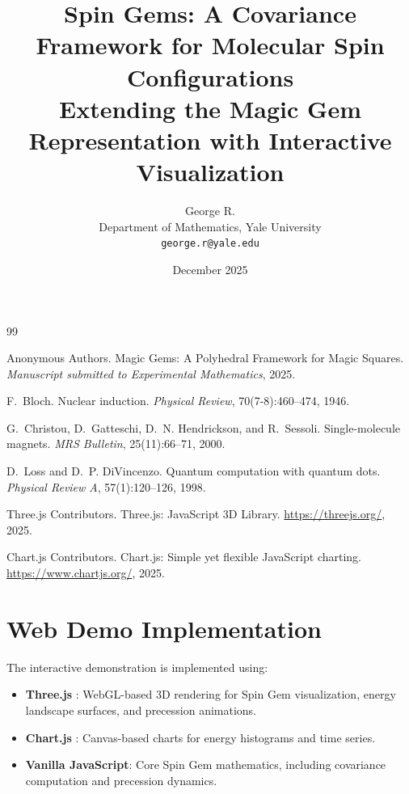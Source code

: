 \documentclass[11pt]{article}
\title{\textbf{Spin Gems: A Covariance Framework for Molecular Spin Configurations}\\[0.5em]
\large Extending the Magic Gem Representation with Interactive Visualization}
\author{George R.\\
Department of Mathematics, Yale University\\
\texttt{george.r@yale.edu}}
\date{December 2025}
\begin{document}
\maketitle









\begin{thebibliography}{99}

Anonymous Authors.
\newblock Magic Gems: A Polyhedral Framework for Magic Squares.
\newblock \emph{Manuscript submitted to Experimental Mathematics}, 2025.

F.~Bloch.
\newblock Nuclear induction.
\newblock \emph{Physical Review}, 70(7-8):460--474, 1946.

G.~Christou, D.~Gatteschi, D.~N. Hendrickson, and R.~Sessoli.
\newblock Single-molecule magnets.
\newblock \emph{MRS Bulletin}, 25(11):66--71, 2000.

D.~Loss and D.~P. DiVincenzo.
\newblock Quantum computation with quantum dots.
\newblock \emph{Physical Review A}, 57(1):120--126, 1998.

Three.js Contributors.
\newblock Three.js: JavaScript 3D Library.
\newblock \url{https://threejs.org/}, 2025.

Chart.js Contributors.
\newblock Chart.js: Simple yet flexible JavaScript charting.
\newblock \url{https://www.chartjs.org/}, 2025.

\end{thebibliography}

\appendix

\section{Web Demo Implementation}
\label{app:demo}

The interactive demonstration is implemented using:

\begin{itemize}
    \item \textbf{Three.js} \cite{threejs}: WebGL-based 3D rendering for Spin Gem visualization, energy landscape surfaces, and precession animations.
    \item \textbf{Chart.js} \cite{chartjs}: Canvas-based charts for energy histograms and time series.
    \item \textbf{Vanilla JavaScript}: Core Spin Gem mathematics, including covariance computation and precession dynamics.
\end{itemize}
\end{document}
